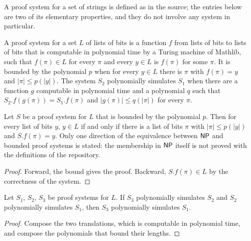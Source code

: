 A proof system for a set of strings is defined as in the source; the entries below are two of its
elementary properties, and they do not involve any system in particular.

\begin{definition}
  \label{def:arithmetic-proof-system}
  \leanok
  A proof system for a set $L$ of lists of bits is a function $f$ from lists of bits to lists of bits
  that is computable in polynomial time by a Turing machine of Mathlib, such that $f(\pi) \in L$ for
  every $\pi$ and every $y \in L$ is $f(\pi)$ for some $\pi$. It is bounded by the polynomial $p$ when
  for every $y \in L$ there is $\pi$ with $f(\pi) = y$ and $|\pi| \le p(|y|)$. The system $S_2$
  polynomially simulates $S_1$ when there are a function $g$ computable in polynomial time and a
  polynomial $q$ such that $S_2.f(g(\pi)) = S_1.f(\pi)$ and $|g(\pi)| \le q(|\pi|)$ for every $\pi$.
\end{definition}

\begin{theorem}
  \label{thm:arithmetic-proof-np-form}
  \leanok
  Let $S$ be a proof system for $L$ that is bounded by the polynomial $p$. Then for every list of bits
  $y$, $y \in L$ if and only if there is a list of bits $\pi$ with $|\pi| \le p(|y|)$ and $S.f(\pi) = y$.
  Only one direction of the equivalence between $\mathsf{NP}$ and bounded proof systems is stated: the
  membership in $\mathsf{NP}$ itself is not proved with the definitions of the repository.
\end{theorem}

\begin{proof}
  \leanok
  Forward, the bound gives the proof. Backward, $S.f(\pi) \in L$ by the correctness of the system.
\end{proof}

\begin{theorem}
  \label{thm:arithmetic-psimula-trans}
  \leanok
  Let $S_1$, $S_2$, $S_3$ be proof systems for $L$. If $S_3$ polynomially simulates $S_2$ and $S_2$
  polynomially simulates $S_1$, then $S_3$ polynomially simulates $S_1$.
\end{theorem}

\begin{proof}
  \leanok
  Compose the two translations, which is computable in polynomial time, and compose the polynomials
  that bound their lengths.
\end{proof}
